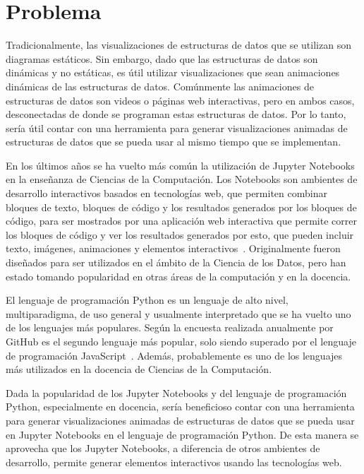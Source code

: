 \chapter{Problema}

Tradicionalmente, las visualizaciones de estructuras de datos que se utilizan son diagramas estáticos. Sin embargo, dado que las estructuras de datos son dinámicas y no estáticas, es útil utilizar visualizaciones que sean animaciones dinámicas de las estructuras de datos. Comúnmente las animaciones de estructuras de datos son videos o páginas web interactivas, pero en ambos casos, desconectadas de donde se programan estas estructuras de datos. Por lo tanto, sería útil contar con una herramienta para generar visualizaciones animadas de estructuras de datos que se pueda usar al mismo tiempo que se implementan.

En los últimos años se ha vuelto más común la utilización de Jupyter Notebooks en la enseñanza de Ciencias de la Computación. Los Notebooks son ambientes de desarrollo interactivos basados en tecnologías web, que permiten combinar bloques de texto, bloques de código y los resultados generados por los bloques de código, para ser mostrados por una aplicación web interactiva que permite correr los bloques de código y ver los resultados generados por esto, que pueden incluir texto, imágenes, animaciones y elementos interactivos~\cite{kluyver2016jupyter}. Originalmente fueron diseñados para ser utilizados en el ámbito de la Ciencia de los Datos, pero han estado tomando popularidad en otras áreas de la computación y en la docencia.

El lenguaje de programación Python es un lenguaje de alto nivel, multiparadigma, de uso general y usualmente interpretado que se ha vuelto uno de los lenguajes más populares. Según la encuesta realizada anualmente por GitHub es el segundo lenguaje más popular, solo siendo superado por el lenguaje de programación JavaScript~\cite{encuesta-github}. Además, probablemente es uno de los lenguajes más utilizados en la docencia de Ciencias de la Computación.

Dada la popularidad de los Jupyter Notebooks y del lenguaje de programación Python, especialmente en docencia, sería beneficioso contar con una herramienta para generar visualizaciones animadas de estructuras de datos que se pueda usar en Jupyter Notebooks en el lenguaje de programación Python. De esta manera se aprovecha que los Jupyter Notebooks, a diferencia de otros ambientes de desarrollo, permite generar elementos interactivos usando las tecnologías web.

